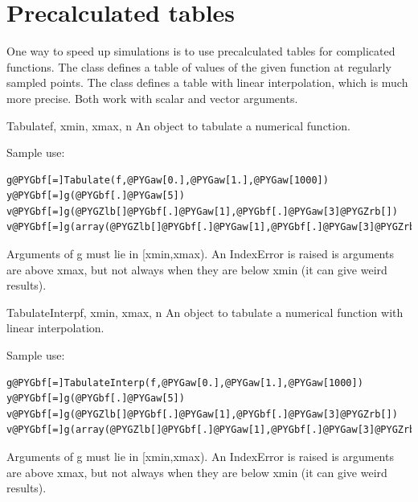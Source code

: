 \documentclass[letterpaper,10pt,english]{manual}
\begin{document}
\resetcurrentobjects
\hypertarget{--doc-tabulate}{}

\section{Precalculated tables}

One way to speed up simulations is to use precalculated tables for complicated
functions. The \hyperlink{brian.Tabulate}{} class defines a table of values of the
given function at regularly sampled points. The \hyperlink{brian.TabulateInterp}{} class
defines a table with linear interpolation, which is much more precise. Both work
with scalar and vector arguments.

\hypertarget{brian.Tabulate}{}\begin{classdesc}{Tabulate}{f, xmin, xmax, n}
An object to tabulate a numerical function.

Sample use:

\begin{Verbatim}[commandchars=@\[\]]
g@PYGbf[=]Tabulate(f,@PYGaw[0.],@PYGaw[1.],@PYGaw[1000])
y@PYGbf[=]g(@PYGbf[.]@PYGaw[5])
v@PYGbf[=]g(@PYGZlb[]@PYGbf[.]@PYGaw[1],@PYGbf[.]@PYGaw[3]@PYGZrb[])
v@PYGbf[=]g(array(@PYGZlb[]@PYGbf[.]@PYGaw[1],@PYGbf[.]@PYGaw[3]@PYGZrb[]))
\end{Verbatim}

Arguments of g must lie in {[}xmin,xmax).
An IndexError is raised is arguments are above xmax, but
not always when they are below xmin (it can give weird results).
\end{classdesc}

\hypertarget{brian.TabulateInterp}{}\begin{classdesc}{TabulateInterp}{f, xmin, xmax, n}
An object to tabulate a numerical function with linear interpolation.

Sample use:

\begin{Verbatim}[commandchars=@\[\]]
g@PYGbf[=]TabulateInterp(f,@PYGaw[0.],@PYGaw[1.],@PYGaw[1000])
y@PYGbf[=]g(@PYGbf[.]@PYGaw[5])
v@PYGbf[=]g(@PYGZlb[]@PYGbf[.]@PYGaw[1],@PYGbf[.]@PYGaw[3]@PYGZrb[])
v@PYGbf[=]g(array(@PYGZlb[]@PYGbf[.]@PYGaw[1],@PYGbf[.]@PYGaw[3]@PYGZrb[]))
\end{Verbatim}

Arguments of g must lie in {[}xmin,xmax).
An IndexError is raised is arguments are above xmax, but
not always when they are below xmin (it can give weird results).
\end{classdesc}
\end{document}
